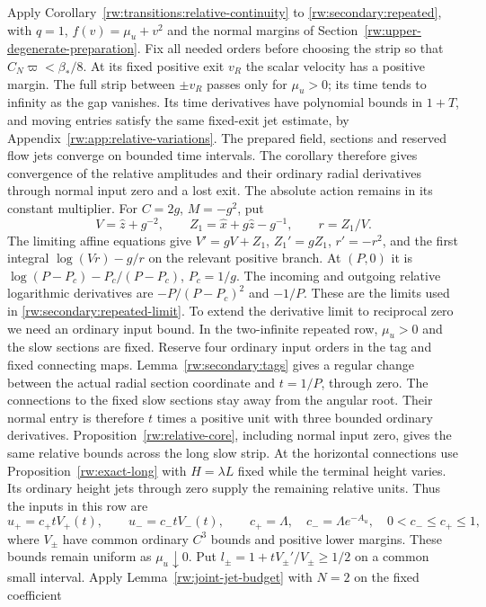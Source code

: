 Apply Corollary~\ref{rw:transitions:relative-continuity} to
\eqref{rw:secondary:repeated}, with $q=1$, $f(v)=\mu_u+v^2$ and
the normal margins of Section~\ref{rw:upper-degenerate-preparation}.
Fix all needed orders before choosing the strip so that
$C_N\varpi<\beta_*/8$. At its fixed positive exit $v_R$ the scalar
velocity has a positive margin. The full strip between $\pm v_R$
passes only for $\mu_u>0$; its time tends to infinity as the gap
vanishes. Its time derivatives have polynomial bounds in $1+T$,
and moving entries satisfy the same fixed-exit jet estimate, by
Appendix~\ref{rw:app:relative-variations}. The prepared field,
sections and reserved flow jets converge on bounded time intervals.
The corollary therefore gives convergence of the relative amplitudes
and their ordinary radial derivatives through normal input zero and
a lost exit. The absolute action remains in its constant multiplier.
For $C=2g$, $M=-g^2$, put
\[
 V=\hat z+g^{-2},\qquad Z_1=\hat x+g\hat z-g^{-1},\qquad r=Z_1/V.
\]
The limiting affine equations give
$V'=gV+Z_1$, $Z_1'=gZ_1$, $r'=-r^2$, and the first integral
$\log(Vr)-g/r$ on the relevant positive branch.
At $(P,0)$ it is
$\log(P-P_c)-P_c/(P-P_c)$, $P_c=1/g$.
The incoming and outgoing relative logarithmic derivatives are
$-P/(P-P_c)^2$ and $-1/P$. These are the limits used in
\eqref{rw:secondary:repeated-limit}.
To extend the derivative limit to reciprocal zero we need an ordinary
input bound. In the two-infinite repeated row, $\mu_u>0$ and the slow
sections are fixed.
Reserve four ordinary input orders in the tag and fixed connecting maps.
Lemma~\ref{rw:secondary:tags} gives a regular change between the actual
radial section coordinate and $t=1/P$, through zero. The connections
to the fixed slow sections stay away from the angular root. Their
normal entry is therefore $t$ times a positive unit with three bounded
ordinary derivatives. Proposition~\ref{rw:relative-core}, including
normal input zero, gives the same relative bounds across the long slow
strip. At the horizontal connections use Proposition~\ref{rw:exact-long}
with $H=\lambda L$ fixed while the terminal height varies. Its ordinary
height jets through zero supply the remaining relative units. Thus
the inputs in this row are
\[
 u_+=c_+tV_+(t),\qquad u_-=c_-tV_-(t),\qquad
 c_+=\Lambda,\quad c_-=\Lambda e^{-A_u},\quad
 0<c_-\le c_+\le1,
\]
where $V_\pm$ have common ordinary $C^3$ bounds and positive lower
margins. These bounds remain uniform as $\mu_u\downarrow0$.
Put $l_\pm=1+tV_\pm'/V_\pm\ge1/2$ on a common small interval.
Apply Lemma~\ref{rw:joint-jet-budget} with $N=2$ on the fixed coefficient

